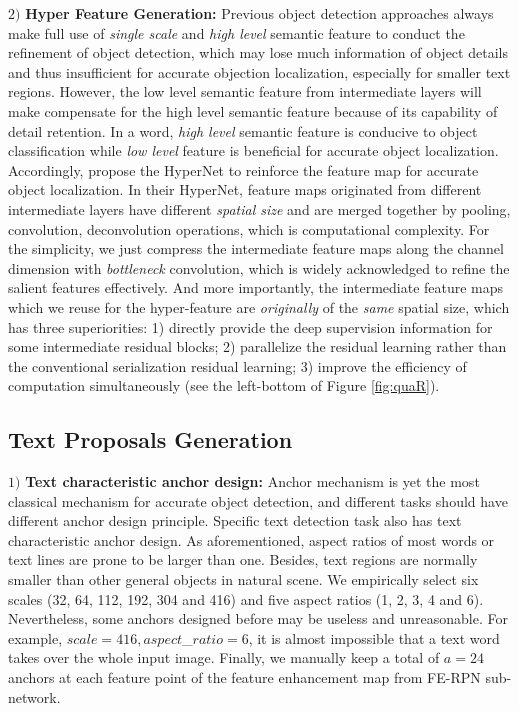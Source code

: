 \documentclass[letterpaper]{article}
\begin{document}
$2)$ \textbf{Hyper Feature Generation:} Previous object detection approaches always make full use of \textit{single scale} and \textit{high level} semantic feature to conduct the refinement of object detection, which may lose much information of object details and thus insufficient for accurate objection localization, especially for smaller text regions. However, the low level semantic feature from intermediate layers will make compensate for the high level semantic feature because of its capability of detail retention. In a word, \textit{high level} semantic feature is conducive to object classification while \textit{low level} feature is beneficial for accurate object localization. Accordingly, \cite{kong2016hypernet} propose the HyperNet to reinforce the feature map for accurate object localization. In their HyperNet, feature maps originated from different intermediate layers have different \textit{spatial size} and are merged together by pooling, convolution, deconvolution operations, which is computational complexity. For the simplicity, we just compress the intermediate feature maps along the channel dimension with \textit{bottleneck} convolution, which is widely acknowledged to refine the salient features effectively. And more importantly, the intermediate feature maps which we reuse for the hyper-feature are \textit{originally} of the \textit{same} spatial size, which has three superiorities: 1) directly provide the deep supervision information for some intermediate residual blocks; 2) parallelize the residual learning rather than the conventional serialization residual learning; 3) improve the efficiency of computation simultaneously (see the left-bottom of Figure \ref{fig:quaR}).
 
\subsection{Text Proposals Generation}
$1)$ \textbf{Text characteristic anchor design:} Anchor mechanism \cite{ren2015faster} is yet the most classical mechanism for accurate object detection, and different tasks should have different anchor design principle. Specific text detection task also has text characteristic anchor design. As aforementioned, aspect ratios of most words or text lines are prone to be larger than one. Besides, text regions are normally smaller than other general objects in natural scene. We empirically select six scales (32, 64, 112, 192, 304 and 416) and five aspect ratios (1, 2, 3, 4 and 6). Nevertheless, some anchors designed before may be useless and unreasonable. For example, $scale = 416, aspect$\_$ratio = 6$, it is almost impossible that a text word takes over the whole input image. Finally, we manually keep a total of $a = 24$ anchors at each feature point of the feature enhancement map from FE-RPN sub-network.
\end{document}
